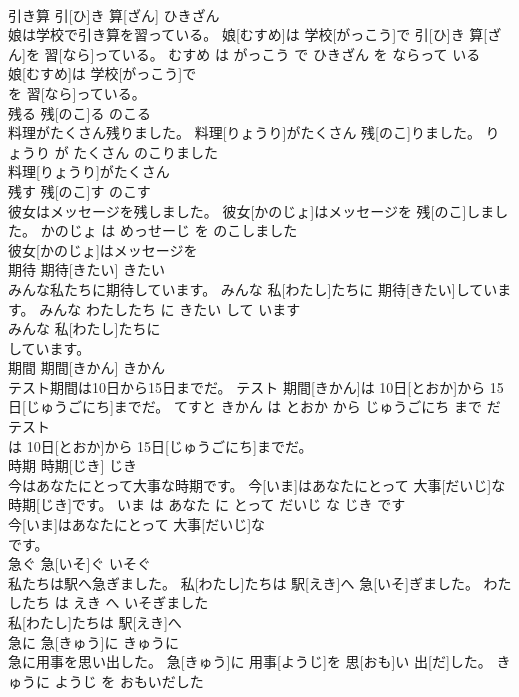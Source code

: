 \documentclass[8pt]{extreport}
\begin{document}
\begin{CJK}{UTF8}{min}
\\	引き算	引[ひ]き 算[ざん]	ひきざん	
\\	娘は学校で引き算を習っている。	娘[むすめ]は 学校[がっこう]で 引[ひ]き 算[ざん]を 習[なら]っている。	むすめ は がっこう で ひきざん を ならって いる	
\\	娘[むすめ]は 学校[がっこう]で
\\	を 習[なら]っている。			
\\	残る	残[のこ]る	のこる	
\\	料理がたくさん残りました。	料理[りょうり]がたくさん 残[のこ]りました。	りょうり が たくさん のこりました	
\\	料理[りょうり]がたくさん
\\	残す	残[のこ]す	のこす	
\\	彼女はメッセージを残しました。	彼女[かのじょ]はメッセージを 残[のこ]しました。	かのじょ は めっせーじ を のこしました	
\\	彼女[かのじょ]はメッセージを
\\	期待	期待[きたい]	きたい	
\\	みんな私たちに期待しています。	みんな 私[わたし]たちに 期待[きたい]しています。	みんな わたしたち に きたい して います	
\\	みんな 私[わたし]たちに
\\	しています。			
\\	期間	期間[きかん]	きかん	
\\	テスト期間は10日から15日までだ。	テスト 期間[きかん]は 10日[とおか]から 15日[じゅうごにち]までだ。	てすと きかん は とおか から じゅうごにち まで だ	
\\	テスト
\\	は 10日[とおか]から 15日[じゅうごにち]までだ。			
\\	時期	時期[じき]	じき	
\\	今はあなたにとって大事な時期です。	今[いま]はあなたにとって 大事[だいじ]な 時期[じき]です。	いま は あなた に とって だいじ な じき です	
\\	今[いま]はあなたにとって 大事[だいじ]な
\\	です。			
\\	急ぐ	急[いそ]ぐ	いそぐ	
\\	私たちは駅へ急ぎました。	私[わたし]たちは 駅[えき]へ 急[いそ]ぎました。	わたしたち は えき へ いそぎました	
\\	私[わたし]たちは 駅[えき]へ
\\	急に	急[きゅう]に	きゅうに	
\\	急に用事を思い出した。	急[きゅう]に 用事[ようじ]を 思[おも]い 出[だ]した。	きゅうに ようじ を おもいだした	

\end{CJK}
\end{document}
